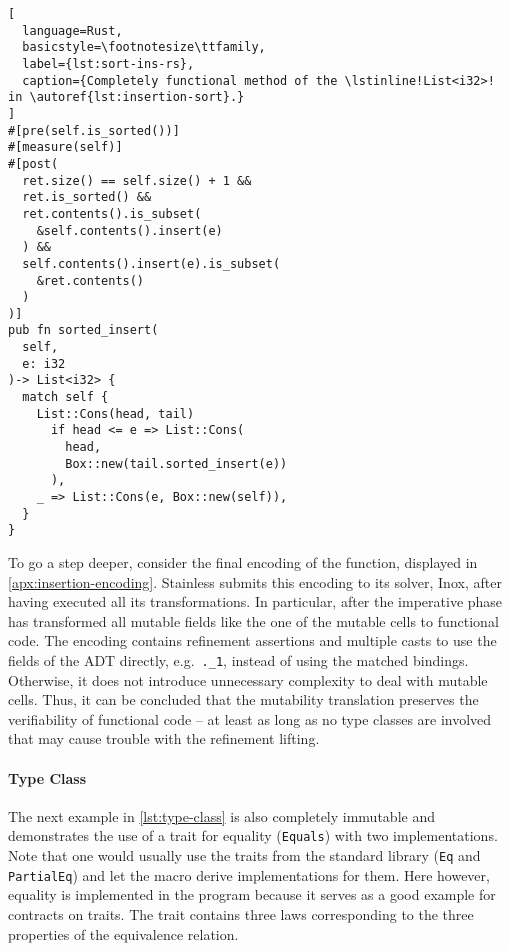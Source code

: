 \noindent\begin{minipage}[t]{.43\textwidth}
\begin{lstlisting}[
  language=Rust,
  basicstyle=\footnotesize\ttfamily,
  label={lst:sort-ins-rs},
  caption={Completely functional method of the \lstinline!List<i32>! in \autoref{lst:insertion-sort}.}
]
#[pre(self.is_sorted())]
#[measure(self)]
#[post(
  ret.size() == self.size() + 1 &&
  ret.is_sorted() &&
  ret.contents().is_subset(
    &self.contents().insert(e)
  ) &&
  self.contents().insert(e).is_subset(
    &ret.contents()
  )
)]
pub fn sorted_insert(
  self,
  e: i32
)-> List<i32> {
  match self {
    List::Cons(head, tail)
      if head <= e => List::Cons(
        head,
        Box::new(tail.sorted_insert(e))
      ),
    _ => List::Cons(e, Box::new(self)),
  }
}
\end{lstlisting}
\end{minipage}\hfill
\begin{minipage}[t]{.55\textwidth}

\end{minipage}

To go a step deeper, consider the final encoding of the function, displayed in
\autoref{apx:insertion-encoding}. Stainless submits this encoding to its solver,
Inox, after having executed all its transformations. In particular, after the
imperative phase has transformed all mutable fields like the one of the mutable
cells to functional code. The encoding contains refinement assertions and
multiple casts to use the fields of the ADT directly, e.g.~\lstinline!._1!,
instead of using the matched bindings. Otherwise, it does not introduce
unnecessary complexity to deal with mutable cells. Thus, it can be concluded
that the mutability translation preserves the verifiability of functional code
-- at least as long as no type classes are involved that may cause trouble with
the refinement lifting.

\paragraph{Type Class}

The next example in \autoref{lst:type-class} is also completely immutable and
demonstrates the use of a trait for equality (\lstinline!Equals!) with two
implementations. Note that one would usually use the traits from the standard
library (\lstinline!Eq! and \lstinline!PartialEq!) and let the macro derive
implementations for them. Here however, equality is implemented in the program
because it serves as a good example for contracts on traits. The trait contains
three laws corresponding to the three properties of the equivalence relation.

